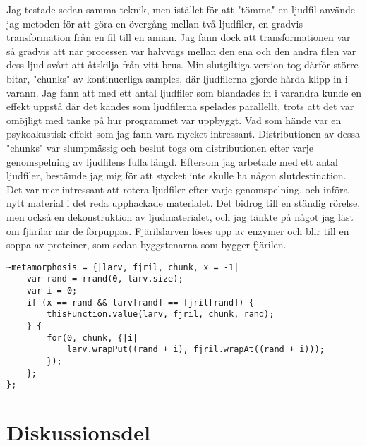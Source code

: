 \documentclass{article}
\renewcommand{\baselinestretch}{1.5}
\begin{document}
  Jag testade sedan samma teknik, men istället för att "tömma" en ljudfil använde jag metoden för att göra en
  övergång mellan två ljudfiler, en gradvis transformation från en fil till en annan. Jag fann dock att
  transformationen var så gradvis att när processen var halvvägs mellan den ena och den andra filen var dess
  ljud svårt att åtskilja från vitt brus. Min slutgiltiga version tog därför större bitar, "chunks" av
  kontinuerliga samples, där ljudfilerna gjorde hårda klipp in i varann. Jag fann att med ett antal ljudfiler
  som blandades in i varandra kunde en effekt uppstå där det kändes som ljudfilerna spelades parallellt, trots
  att det var omöjligt med tanke på hur programmet var uppbyggt. Vad som hände var en psykoakustisk effekt som
  jag fann vara mycket intressant. Distributionen av dessa "chunks" var slumpmässig och beslut togs om
  distributionen efter varje genomspelning av ljudfilens fulla längd. Eftersom jag arbetade med ett antal
  ljudfiler, bestämde jag mig för att stycket inte skulle ha någon slutdestination. Det var mer intressant att
  rotera ljudfiler efter varje genomspelning, och införa nytt material i det reda upphackade materialet. Det
  bidrog till en ständig rörelse, men också en dekonstruktion av ljudmaterialet, och jag tänkte på något jag
  läst om fjärilar när de förpuppas. Fjärilslarven löses upp av enzymer och blir till en soppa av proteiner,
  som sedan byggstenarna som bygger fjärilen.

\renewcommand{\baselinestretch}{1}
\begin{lstlisting}[style=SuperCollider-IDE, caption=Funktion för "metamorfos"]
~metamorphosis = {|larv, fjril, chunk, x = -1|
	var rand = rrand(0, larv.size);
	var i = 0;
	if (x == rand && larv[rand] == fjril[rand]) {
		thisFunction.value(larv, fjril, chunk, rand);
	} {
		for(0, chunk, {|i|
			larv.wrapPut((rand + i), fjril.wrapAt((rand + i)));
		});
	};
};
\end{lstlisting}
\renewcommand{\baselinestretch}{1.5}

\section{Diskussionsdel}

  
\end{document}
